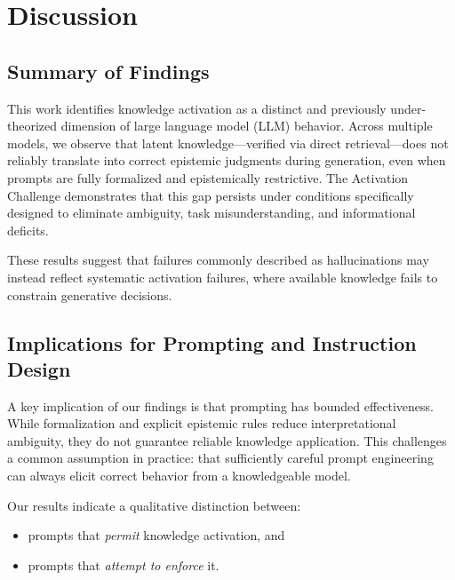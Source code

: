 
\section{Discussion}

\subsection{Summary of Findings}

This work identifies knowledge activation as a distinct and previously under-theorized dimension of large language model (LLM) behavior. Across multiple models, we observe that latent knowledge---verified via direct retrieval---does not reliably translate into correct epistemic judgments during generation, even when prompts are fully formalized and epistemically restrictive. The Activation Challenge demonstrates that this gap persists under conditions specifically designed to eliminate ambiguity, task misunderstanding, and informational deficits.

These results suggest that failures commonly described as hallucinations may instead reflect systematic activation failures, where available knowledge fails to constrain generative decisions.


\subsection{Implications for Prompting and Instruction Design}

A key implication of our findings is that prompting has bounded effectiveness. While formalization and explicit epistemic rules reduce interpretational ambiguity, they do not guarantee reliable knowledge application. This challenges a common assumption in practice: that sufficiently careful prompt engineering can always elicit correct behavior from a knowledgeable model.

Our results indicate a qualitative distinction between:
\begin{itemize}
    \item prompts that \emph{permit} knowledge activation, and
    \item prompts that \emph{attempt to enforce} it.
\end{itemize}

